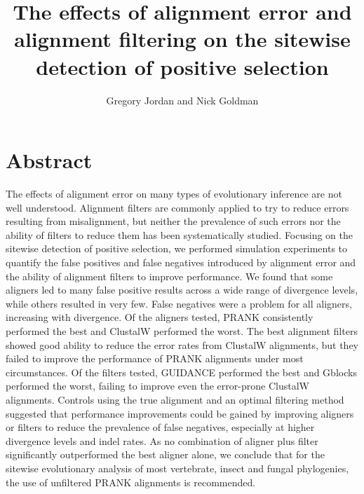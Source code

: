 \documentclass{article}
\begin{document}
\renewcommand\refname{Literature Cited}

\newcommand{\mtwo}{PAML M2a\xspace}
\newcommand{\meight}{PAML M8\xspace}
\newcommand{\pranka}{PRANK$_{\textrm{AA}}$\xspace}
\newcommand{\prankc}{PRANK$_{\textrm{C}}$\xspace}
\newcommand{\omg}{\bm{\omega}\xspace}
\newcommand{\tpr}{TPR$_{1\%}$\xspace}
\newcommand{\sw}{sitewise\xspace}
\newcommand{\Sw}{Sitewise\xspace}
\newcommand{\Dr}{{\em Drosophila}\xspace}

\title{The effects of alignment error and alignment filtering on the \sw detection of positive selection}
\author{{Gregory Jordan and Nick Goldman}}
\maketitle

\section*{Abstract}

The effects of alignment error on many types of evolutionary inference
are not well understood. Alignment filters are commonly applied to try
to reduce errors resulting from misalignment, but neither the
prevalence of such errors nor the ability of filters to reduce them
has been systematically studied. Focusing on the sitewise detection of
positive selection, we performed simulation experiments to quantify
the false positives and false negatives introduced by alignment error
and the ability of alignment filters to improve performance. We found
that some aligners led to many false positive results across a wide
range of divergence levels, while others resulted in very few. False
negatives were a problem for all aligners, increasing with
divergence. Of the aligners tested, PRANK consistently performed the
best and ClustalW performed the worst. The best alignment filters
showed good ability to reduce the error rates from ClustalW
alignments, but they failed to improve the performance of PRANK
alignments under most circumstances. Of the filters tested, GUIDANCE
performed the best and Gblocks performed the worst, failing to improve
even the error-prone ClustalW alignments. Controls using the true
alignment and an optimal filtering method suggested that performance
improvements could be gained by improving aligners or filters to
reduce the prevalence of false negatives, especially at higher
divergence levels and indel rates. As no combination of aligner plus
filter significantly outperformed the best aligner alone, we conclude
that for the sitewise evolutionary analysis of most vertebrate, insect
and fungal phylogenies, the use of unfiltered PRANK alignments is
recommended.
\end{document}
